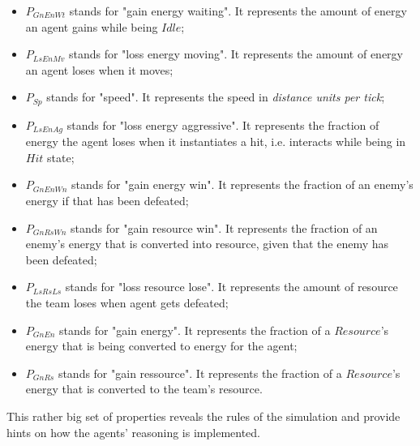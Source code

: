 \begin{itemize}
    \item $P_{GnEnWt}$ stands for "gain energy waiting". It represents the amount of energy an agent gains while being $Idle$;
    \item $P_{LsEnMv}$ stands for "loss energy moving". It represents the amount of energy an agent loses when it moves;
    \item $P_{Sp}$ stands for "speed". It represents the speed in \textit{distance units per tick};
    \item $P_{LsEnAg}$ stands for "loss energy aggressive". It represents the fraction of energy the agent loses when it instantiates a hit, i.e. interacts while being in $Hit$ state;
    \item $P_{GnEnWn}$ stands for "gain energy win". It represents the fraction of an enemy's energy if that has been defeated;
    \item $P_{GnRsWn}$ stands for "gain resource win". It represents the fraction of an enemy's energy that is converted into resource, given that the enemy has been defeated;
    \item $P_{LsRsLs}$ stands for "loss resource lose". It represents the amount of resource the team loses when agent gets defeated;
    \item $P_{GnEn}$ stands for "gain energy". It represents the fraction of a $Resource$'s energy that is being converted to energy for the agent;
    \item $P_{GnRs}$ stands for "gain ressource". It represents the fraction of a $Resource$'s energy that is converted to the team's resource.
\end{itemize}

This rather big set of properties reveals the rules of the simulation and provide hints on how the agents' reasoning
is implemented.
